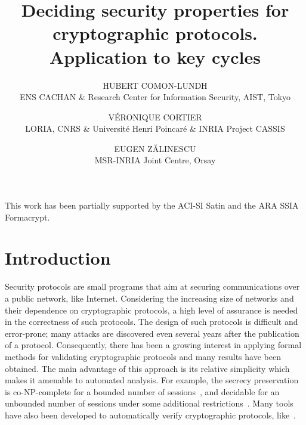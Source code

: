 \documentclass[acmtocl,acmnow]{acmtrans2m}
\title{Deciding security properties for cryptographic protocols. Application to key cycles}
\author{
HUBERT COMON-LUNDH\\
ENS CACHAN \& Research Center for Information Security, AIST, Tokyo
\and
V\'ERONIQUE CORTIER\\
LORIA, CNRS \& Universit\'e Henri Poincar\'e \& INRIA Project CASSIS
\and 
EUGEN Z\u ALINESCU\\
MSR-INRIA Joint Centre, Orsay
}
\begin{document}
\begin{bottomstuff}
This work has been partially supported by the ACI-SI Satin and the ARA SSIA Formacrypt.
\end{bottomstuff}


\maketitle




\section{Introduction}
Security protocols are small programs that aim at securing communications over a public network, like
Internet.
Considering the increasing size of networks and their dependence on
cryptographic protocols, a high level of assurance is needed in the
correctness of such protocols.
The design of such protocols is difficult and error-prone; many attacks are discovered even
several years after the publication of a protocol.
Consequently, there has been 
a growing interest in applying formal methods for validating
cryptographic protocols and many results have been obtained.
The main advantage of this approach is its relative simplicity which makes it
amenable to automated analysis.
For example, the
secrecy preservation is co-NP-complete for a bounded number of sessions~\cite{AL00,RT01},
and decidable for an unbounded number of
sessions under some additional restrictions~\cite{rta03,durgin99undecidability,lowe98towards,ramanujam05jcs}.
Many tools  have also been developed
to automatically verify cryptographic protocols,
like~\cite{avispa2005,Blanchet_CSFW01_efficient_verifier,MS01,cremers08cav}.
\end{document}
